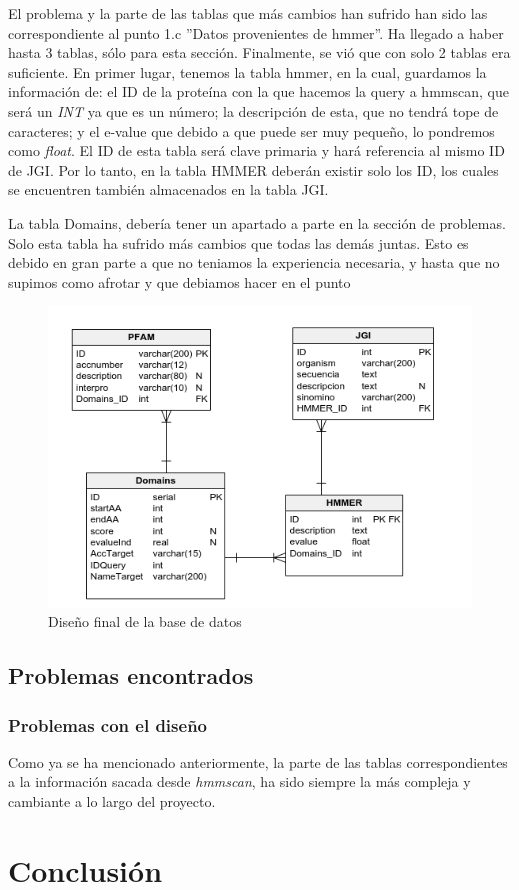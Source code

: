 \documentclass[11pt]{article} %
\begin{document}
El problema y la parte de las tablas que m\'as cambios han sufrido han sido las  correspondiente al punto 1.c ''Datos provenientes de hmmer''. Ha llegado a haber hasta 3 tablas, s\'olo para esta secci\'on. Finalmente, se vi\'o que con solo 2 tablas era suficiente. En primer lugar, tenemos la tabla hmmer, en la cual, guardamos la informaci\'on de: el ID de la prote\'ina con la que hacemos la query a hmmscan, que ser\'a un \emph{INT} ya que es un n\'umero; la descripci\'on de esta, que no tendr\'a  tope de caracteres; y el e-value que debido a que puede ser muy peque\~no, lo pondremos como \emph{float}. El ID de esta tabla ser\'a clave primaria y har\'a referencia al mismo ID de JGI. Por lo tanto, en la tabla HMMER deber\'an existir solo los ID, los cuales se encuentren tambi\'en almacenados en la tabla JGI. 

La tabla Domains, deber\'ia tener un apartado a parte en la secci\'on de problemas. Solo esta tabla ha sufrido m\'as cambios que todas las dem\'as juntas. Esto es debido en gran parte a que no teniamos la experiencia necesaria, y hasta que no supimos como afrotar y que debiamos hacer en el punto 


\begin{figure}
\centering
\includegraphics[width=15cm]{design}
\caption{Dise\~no final de la base de datos\label{fig:Design}}
\end{figure}

\subsection{Problemas encontrados}

\subsubsection{Problemas con el dise\~no}

Como ya se ha mencionado anteriormente, la parte de las tablas correspondientes a la informaci\'on sacada desde \emph{hmmscan}, ha sido siempre la m\'as compleja y cambiante a lo largo del proyecto.

\section{Conclusi\'on}
\end{document}

